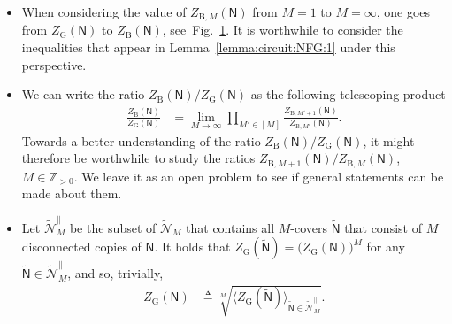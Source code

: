 \documentclass[journal, twocolumn]{IEEEtran}
\renewcommand{\leq}{\leqslant}
\newcommand{\Z}{\mathbb{Z}}
\newcommand{\Zpp}{\Z_{>0}}
\newcommand{\set}[1]{\mathcal{#1}}
\newcommand{\graph}[1]{\mathsf{#1}}
\newcommand{\defeq}{\triangleq}
\newcommand{\graphN}{\graph{N}}
\newcommand{\ZBethe}{Z_{\mathrm{B}}}
\newcommand{\ZBetheM}[1]{Z_{\mathrm{B}, #1}}
\newcommand{\cover}[1]{\tilde{#1}}
\newcommand{\cset}[1]{\cover{\set{#1}}}
\newcommand{\cgraph}[1]{\cover{\graph{#1}}}
\newcommand{\?}{\mathrm{?}}
\newcommand{\ZGibbs}{Z_{\mathrm{G}}}
\begin{document}
\begin{itemize}
  Moreover, the paper~\cite{Vontobel:11:3:subm} presented setups where the
  inequality $\ZGibbs(\cgraph{N}) \leq \big( \ZGibbs(\graphN) \big)^M$ holds
  for every $M$-cover $\cgraph{N}$ of an NFG $\graphN$ whose partition
  function represents the permanent of a non-negative matrix, and pointed out
  setups where this inequality is conjectured to hold. Further NFGs where this
  inequality is conjectured to hold were listed by
  Watanabe~\cite{Watanabe:11:1}.


\begin{figure}
  \begin{alignat*}{2}
    &\big.
       \ZBetheM{M}(\graphN)
     \big|_{M \to \infty}
        &&= \ZBethe(\graphN) \\
    &\hskip1cm \Big\vert \\
    &\big.
       \ZBetheM{M}(\graphN)
     \big. && \\
    &\hskip1cm \Big\vert \\
    &\big.
       \ZBetheM{M}(\graphN)
     \big|_{M = 1}
       &&= \ZGibbs(\graphN)
  \end{alignat*}
  \caption{The degree-$M$ Bethe partition function of the NFG $\graphN$ for
    different values of $M$.}
  \label{fig:degree:M:Bethe:partition:function:1}
\end{figure}


\item When considering the value of $\ZBetheM{M}(\graphN)$ from $M = 1$ to $M
  = \infty$, one goes from $\ZGibbs(\graphN)$ to $\ZBethe(\graphN)$,
  see~Fig.~\ref{fig:degree:M:Bethe:partition:function:1}. It is worthwhile to
  consider the inequalities that appear in Lemma~\ref{lemma:circuit:NFG:1}
  under this perspective.

\item We can write the ratio $\ZBethe(\graphN) / \ZGibbs(\graphN)$ as the
  following telescoping product
  \begin{align*}
    \frac{\ZBethe(\graphN)}
         {\ZGibbs(\graphN)}
      &= \lim_{M \to \infty}
           \prod_{M' \in [M]}
             \frac{\ZBetheM{M'+1}(\graphN)}
                  {\ZBetheM{M'}(\graphN)}.
  \end{align*}
  Towards a better understanding of the ratio $\ZBethe(\graphN) /
  \ZGibbs(\graphN)$, it might therefore be worthwhile to study the ratios
  $\ZBetheM{M+1}(\graphN) / \ZBetheM{M}(\graphN)$, $M \in \Zpp$. We leave it
  as an open problem to see if general statements can be made about them.

\item Let $\cset{N}^{\parallel}_M$ be the subset of $\cset{N}_M$ that contains
  all $M$-covers $\cgraph{N}$ that consist of $M$ disconnected copies of
  $\graphN$. It holds that $\ZGibbs(\cgraph{N}) = \bigl( \ZGibbs(\graphN)
  \bigr)^M$ for any $\cgraph{N} \in \cset{N}^{\parallel}_M$, and so, trivially,
  \begin{align*}
    \ZGibbs(\graphN)
      &\defeq
         \sqrt[M]{\Big\langle \!
                    \ZGibbs(\cgraph{N})
                  \! \Big\rangle_{\cgraph{N} \in \cset{N}^{\parallel}_{M}}}.
  \end{align*}
  

\end{itemize}
\end{document}

